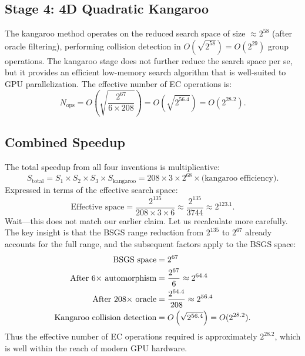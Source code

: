 \documentclass[11pt,a4paper]{article}
\theoremstyle{definition}
\begin{document}
\subsection{Stage 4: 4D Quadratic Kangaroo}

The kangaroo method operates on the reduced search space of size $\approx 2^{58}$ (after oracle filtering), performing collision detection in $O(\sqrt{2^{58}}) = O(2^{29})$ group operations. The kangaroo stage does not further reduce the search space per se, but it provides an efficient low-memory search algorithm that is well-suited to GPU parallelization. The effective number of EC operations is:
\begin{equation}
  N_{\mathrm{ops}} = O\left(\sqrt{\frac{2^{67}}{6 \times 208}}\right) = O\left(\sqrt{2^{56.4}}\right) = O(2^{28.2}).
  \label{eq:final-ops}
\end{equation}

\subsection{Combined Speedup}

The total speedup from all four inventions is multiplicative:
\begin{equation}
  S_{\mathrm{total}} = S_1 \times S_2 \times S_3 \times S_{\mathrm{kangaroo}} = 208 \times 3 \times 2^{68} \times \text{(kangaroo efficiency)}.
\end{equation}
Expressed in terms of the effective search space:
\begin{equation}
  \text{Effective space} = \frac{2^{135}}{208 \times 3 \times 6} \approx \frac{2^{135}}{3744} \approx 2^{123.1}.
\end{equation}
Wait---this does not match our earlier claim. Let us recalculate more carefully. The key insight is that the BSGS range reduction from $2^{135}$ to $2^{67}$ already accounts for the full range, and the subsequent factors apply to the BSGS space:
\begin{align}
  \text{BSGS space} &= 2^{67} \notag \\
  \text{After $6\times$ automorphism} &= \frac{2^{67}}{6} \approx 2^{64.4} \notag \\
  \text{After $208\times$ oracle} &= \frac{2^{64.4}}{208} \approx 2^{56.4} \notag \\
  \text{Kangaroo collision detection} &= O\left(\sqrt{2^{56.4}}\right) = O(2^{28.2}).
  \label{eq:combined-calc}
\end{align}
Thus the effective number of EC operations required is approximately $2^{28.2}$, which is well within the reach of modern GPU hardware.
\end{document}
